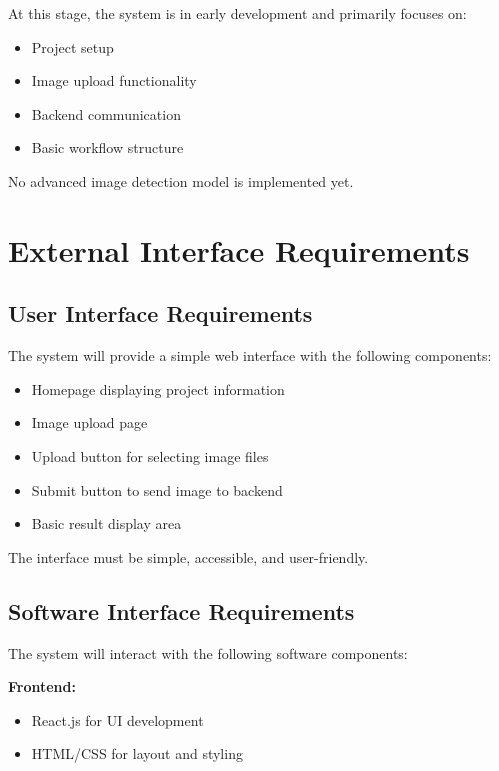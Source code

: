 \documentclass[12pt]{article}
\begin{document}
At this stage, the system is in early development and primarily focuses on:

\begin{itemize}
    \item Project setup
    \item Image upload functionality
    \item Backend communication
    \item Basic workflow structure
\end{itemize}

No advanced image detection model is implemented yet.

\section{External Interface Requirements}

\subsection{User Interface Requirements}

The system will provide a simple web interface with the following components:

\begin{itemize}
    \item Homepage displaying project information
    \item Image upload page
    \item Upload button for selecting image files
    \item Submit button to send image to backend
    \item Basic result display area
\end{itemize}

The interface must be simple, accessible, and user-friendly.

\subsection{Software Interface Requirements}

The system will interact with the following software components:

\textbf{Frontend:}

\begin{itemize}
    \item React.js for UI development
    \item HTML/CSS for layout and styling
\end{itemize}
\end{document}
